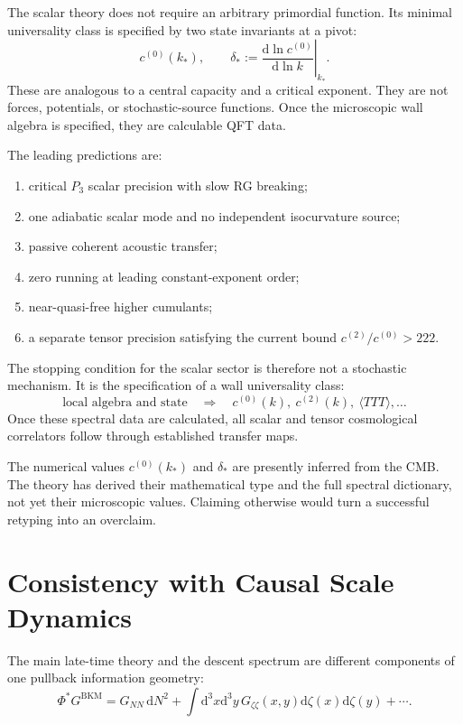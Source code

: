 \documentclass[11pt]{article}
\numberwithin{equation}{section}
\newcommand{\dd}{\mathrm d}
\newcommand{\BKM}{\mathrm{BKM}}
\newcommand{\cz}{c^{(0)}}
\newcommand{\ct}{c^{(2)}}
\begin{document}
The scalar theory does not require an arbitrary primordial function. Its minimal universality class is specified by two state invariants at a pivot:
\begin{equation}
\boxed{\cz(k_*),\qquad \delta_*:=\left.\frac{\dd\ln\cz}{\dd\ln k}\right|_{k_*}.}
\end{equation}
These are analogous to a central capacity and a critical exponent. They are not forces, potentials, or stochastic-source functions. Once the microscopic wall algebra is specified, they are calculable QFT data.

The leading predictions are:
\begin{enumerate}
\item critical $P_3$ scalar precision with slow RG breaking;
\item one adiabatic scalar mode and no independent isocurvature source;
\item passive coherent acoustic transfer;
\item zero running at leading constant-exponent order;
\item near-quasi-free higher cumulants;
\item a separate tensor precision satisfying the current bound $\ct/\cz>222$.
\end{enumerate}

The stopping condition for the scalar sector is therefore not a stochastic mechanism. It is the specification of a wall universality class:
\begin{equation}
\boxed{
\text{local algebra and state}\quad\Longrightarrow\quad\cz(k),\ \ct(k),\ \langle TTT\rangle,\ldots}
\end{equation}
Once these spectral data are calculated, all scalar and tensor cosmological correlators follow through established transfer maps.

\begin{warningbox}
The numerical values $\cz(k_*)$ and $\delta_*$ are presently inferred from the CMB. The theory has derived their mathematical type and the full spectral dictionary, not yet their microscopic values. Claiming otherwise would turn a successful retyping into an overclaim.
\end{warningbox}

\section{Consistency with Causal Scale Dynamics}

The main late-time theory and the descent spectrum are different components of one pullback information geometry:
\begin{equation}
\Phi^*G^{\BKM}
=
G_{NN}\,\dd N^2
+
\int\dd^3x\dd^3y\,G_{\zeta\zeta}(x,y)\dd\zeta(x)\dd\zeta(y)
+\cdots.
\end{equation}
\end{document}
